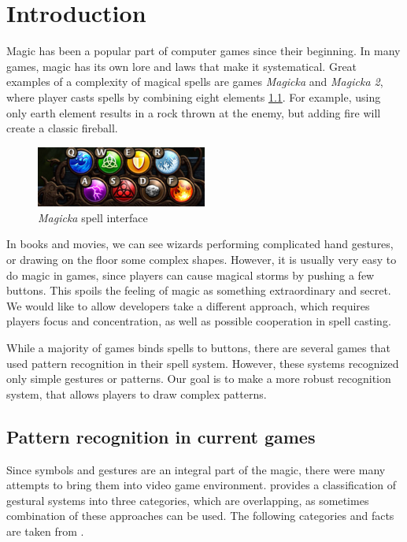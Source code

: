 \chapter{Introduction}
\label{chap:gf}

Magic has been a popular part of computer games since their beginning. In many games, magic has its own lore and laws that make it systematical. Great examples of a complexity of magical spells are games \emph{Magicka} and \emph{Magicka 2}, where player casts spells by combining eight elements \ref{fig:magicka}. For example, using only earth element results in a rock thrown at the enemy, but adding fire will create a classic fireball.
\begin{figure}[!htb]
  \centering
  \includegraphics[width=0.5\textwidth]{ext/magicka.png}
  \caption{\emph{Magicka} spell interface}
  \label{fig:magicka}
\end{figure}

In books and movies, we can see wizards performing complicated hand gestures, or drawing on the floor some complex shapes. However, it is usually very easy to do magic in games, since players can cause magical storms by pushing a few buttons. This spoils the feeling of magic as something extraordinary and secret. We would like to allow developers take a different approach, which requires players focus and concentration, as well as possible cooperation in spell casting.

While a majority of games binds spells to buttons, there are several games that used pattern recognition in their spell system. However, these systems recognized only simple gestures or patterns. Our goal is to make a more robust recognition system, that allows players to draw complex patterns.

\section{Pattern recognition in current games}

Since symbols and gestures are an integral part of the magic, there were many attempts to bring them into video game environment. \citet{gameMagic} provides a classification of gestural systems into three categories, which are overlapping, as sometimes combination of these approaches can be used. The following categories and facts are taken from \citet{gameMagic}.

